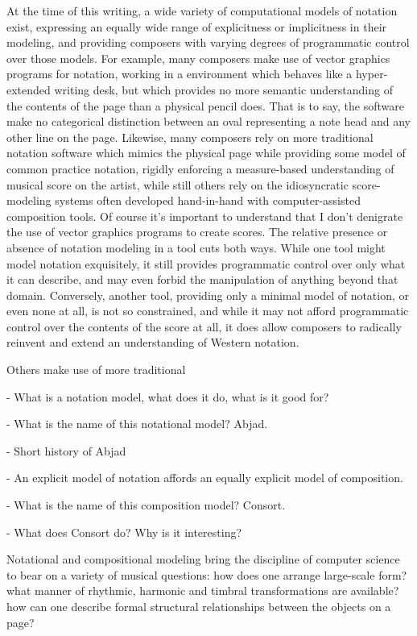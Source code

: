 At the time of this writing, a wide variety of computational models of notation
exist\cite{ baca2015tenor, trevino2013compositional, }, expressing an equally
wide range of explicitness or implicitness in their modeling, and providing
composers with varying degrees of programmatic control over those models. For
example, many composers make use of vector graphics programs for notation,
working in a environment which behaves like a hyper-extended writing desk, but
which provides no more semantic understanding of the contents of the page than
a physical pencil does. That is to say, the software make no categorical
distinction between an oval representing a note head and any other line on the
page. Likewise, many composers rely on more traditional notation software which
mimics the physical page while providing some model of common practice
notation, rigidly enforcing a measure-based understanding of musical
score on the artist, while still others rely on the idiosyncratic
score-modeling systems often developed hand-in-hand with computer-assisted
composition tools. Of course it's important to understand that I don't
denigrate the use of vector graphics programs to create scores. The relative
presence or absence of notation modeling in a tool cuts both ways. While one
tool might model notation exquisitely, it still provides programmatic control
over only what it can describe, and may even forbid the manipulation of
anything beyond that domain. Conversely, another tool, providing only a minimal
model of notation, or even none at all, is not so constrained, and while it may
not afford programmatic control over the contents of the score at all, it does
allow composers to radically reinvent and extend an understanding of Western
notation.

Others make use of more traditional 

- What is a notation model, what does it do, what is it good for?

- What is the name of this notational model? Abjad.

- Short history of Abjad

- An explicit model of notation affords an equally explicit model of
  composition.

- What is the name of this composition model? Consort.

- What does Consort do? Why is it interesting?


Notational and compositional modeling bring the discipline of computer science
to bear on a variety of musical questions: how does one arrange large-scale
form? what manner of rhythmic, harmonic and timbral transformations are
available? how can one describe formal structural relationships between the
objects on a page?


